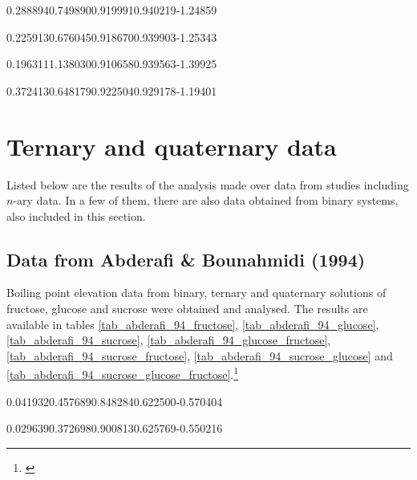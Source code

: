 %
	{0.288894}{0.749890}{0.919991}{0.940219}{-1.24859}

%
	{0.225913}{0.676045}{0.918670}{0.939903}{-1.25343}

%
	{0.196311}{1.138030}{0.910658}{0.939563}{-1.39925}

%
	{0.372413}{0.648179}{0.922504}{0.929178}{-1.19401}
\FloatBarrier

\section{Ternary and quaternary data}

Listed below are the results of the analysis made over data from studies including
$n$-ary data. In a few of them, there are also data obtained from binary systems,
also included in this section.

\subsection{Data from Abderafi \& Bounahmidi (1994)}

Boiling point elevation data from binary, ternary and quaternary solutions
of fructose, glucose and sucrose were obtained and analysed. The results are
available in tables
\ref{tab_abderafi_94_fructose}, \ref{tab_abderafi_94_glucose},
\ref{tab_abderafi_94_sucrose}, \ref{tab_abderafi_94_glucose_fructose},
\ref{tab_abderafi_94_sucrose_fructose}, \ref{tab_abderafi_94_sucrose_glucose} and
\ref{tab_abderafi_94_sucrose_glucose_fructose}.\footnote{\cite{abderafi1994}}

%
	{0.041932}{0.457689}{0.848284}{0.622500}{-0.570404}

%
	{0.029639}{0.372698}{0.900813}{0.625769}{-0.550216}

